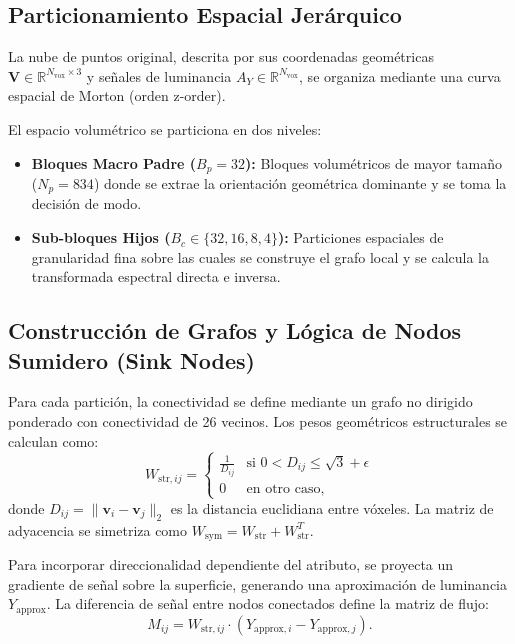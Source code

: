 \documentclass[11pt,a4paper]{article}
\begin{document}
\subsection{Particionamiento Espacial Jerárquico}
La nube de puntos original, descrita por sus coordenadas geométricas $\mathbf{V} \in \mathbb{R}^{N_{\text{vox}} \times 3}$ y señales de luminancia $A_Y \in \mathbb{R}^{N_{\text{vox}}}$, se organiza mediante una curva espacial de Morton (orden z-order). 

El espacio volumétrico se particiona en dos niveles:
\begin{itemize}
  \item \textbf{Bloques Macro Padre ($B_p = 32$):} Bloques volumétricos de mayor tamaño ($N_p = 834$) donde se extrae la orientación geométrica dominante y se toma la decisión de modo.
  \item \textbf{Sub-bloques Hijos ($B_c \in \{32, 16, 8, 4\}$):} Particiones espaciales de granularidad fina sobre las cuales se construye el grafo local y se calcula la transformada espectral directa e inversa.
\end{itemize}

\subsection{Construcción de Grafos y Lógica de Nodos Sumidero (Sink Nodes)}
Para cada partición, la conectividad se define mediante un grafo no dirigido ponderado con conectividad de 26 vecinos. Los pesos geométricos estructurales se calculan como:
\begin{equation}
  W_{\text{str},ij} = 
  \begin{cases}
    \frac{1}{D_{ij}} & \text{si } 0 < D_{ij} \le \sqrt{3} + \epsilon \\[6pt]
    0 & \text{en otro caso},
  \end{cases}
\end{equation}
donde $D_{ij} = \|\mathbf{v}_i - \mathbf{v}_j\|_2$ es la distancia euclidiana entre vóxeles. La matriz de adyacencia se simetriza como $W_{\text{sym}} = W_{\text{str}} + W_{\text{str}}^T$.

Para incorporar direccionalidad dependiente del atributo, se proyecta un gradiente de señal sobre la superficie, generando una aproximación de luminancia $Y_{\text{approx}}$. La diferencia de señal entre nodos conectados define la matriz de flujo:
\begin{equation}
  M_{ij} = W_{\text{str},ij} \cdot (Y_{\text{approx},i} - Y_{\text{approx},j}).
\end{equation}
\end{document}

